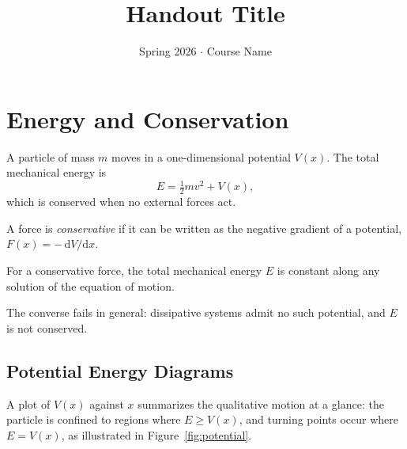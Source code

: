 \documentclass[11pt]{article}
\title{Handout Title}
\date{Spring 2026 $\cdot$ Course Name}
\begin{document}
\maketitle


\section{Energy and Conservation}

A particle of mass $m$ moves in a one-dimensional potential $V(x)$. The total mechanical energy is
\begin{equation}
  E = \tfrac{1}{2} m v^2 + V(x),
\end{equation}
which is conserved when no external forces act.

\begin{important}
\begin{definition}
A force is \emph{conservative} if it can be written as the negative gradient of a potential, $F(x) = -\,\mathrm{d}V/\mathrm{d}x$.
\end{definition}
\end{important}

\begin{mainresult}
\begin{theorem}
For a conservative force, the total mechanical energy $E$ is constant along any solution of the equation of motion.
\end{theorem}
\end{mainresult}

\begin{remark}
The converse fails in general: dissipative systems admit no such potential, and $E$ is not conserved.
\end{remark}

\subsection{Potential Energy Diagrams}

A plot of $V(x)$ against $x$ summarizes the qualitative motion at a glance: the particle is confined to regions where $E \ge V(x)$, and turning points occur where $E = V(x)$, as illustrated in Figure~\ref{fig:potential}.
\end{document}
